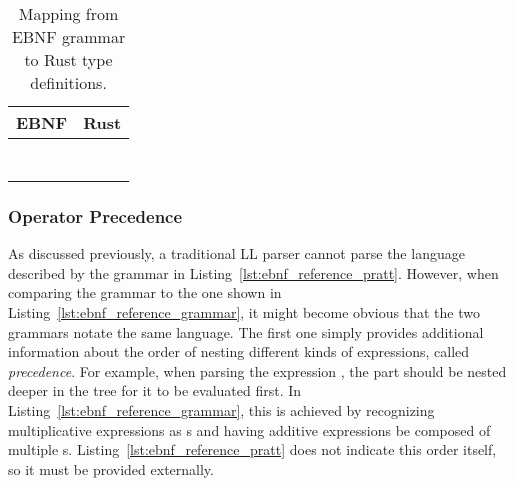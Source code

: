 \begin{table}[h]
	\caption{Mapping from EBNF grammar to Rust type definitions.}\label{tbl:ebnf_to_rust}
	\begin{tabularx}{0.95\textwidth}{Ll}
		 EBNF                         & Rust                                                                         \\
		\hline
		                 &                                     \\
		             &                             \\
		             &                                \\
		            &                                \\
		                 &                                       \\
		 &  \\
		 &  \\
	\end{tabularx}
\end{table}

\subsubsection{Operator Precedence}

As discussed previously, a traditional LL parser cannot parse the language described by the grammar in Listing~\ref{lst:ebnf_reference_pratt}.
However, when comparing the grammar to the one shown in Listing~\ref{lst:ebnf_reference_grammar}, it might become obvious that the two grammars notate the same language.
The first one simply provides additional information about the order of nesting different kinds of expressions, called \emph{precedence}.
For example, when parsing the expression , the  part should be nested deeper in the tree for it to be evaluated first.
In Listing~\ref{lst:ebnf_reference_grammar}, this is achieved by recognizing multiplicative expressions as s and having additive expressions be composed of multiple s.
Listing~\ref{lst:ebnf_reference_pratt} does not indicate this order itself, so it must be provided externally.

